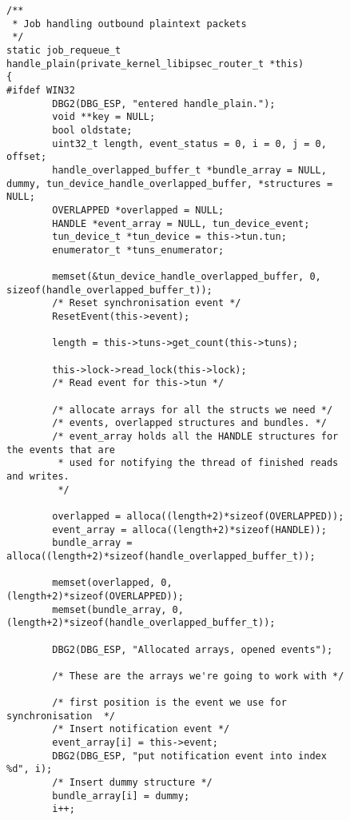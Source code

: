 \begin{figure}
\label{lst:handle_plain_windows}
\begin{lstlisting}[caption=Code für handle\_plain auf Windows]
/**
 * Job handling outbound plaintext packets
 */
static job_requeue_t handle_plain(private_kernel_libipsec_router_t *this)
{
#ifdef WIN32
        DBG2(DBG_ESP, "entered handle_plain.");
        void **key = NULL;
        bool oldstate;
        uint32_t length, event_status = 0, i = 0, j = 0, offset;
        handle_overlapped_buffer_t *bundle_array = NULL, dummy, tun_device_handle_overlapped_buffer, *structures = NULL;
        OVERLAPPED *overlapped = NULL;
        HANDLE *event_array = NULL, tun_device_event;
        tun_device_t *tun_device = this->tun.tun;
        enumerator_t *tuns_enumerator;

        memset(&tun_device_handle_overlapped_buffer, 0, sizeof(handle_overlapped_buffer_t));
        /* Reset synchronisation event */
        ResetEvent(this->event);

        length = this->tuns->get_count(this->tuns);

        this->lock->read_lock(this->lock);
        /* Read event for this->tun */

        /* allocate arrays for all the structs we need */
        /* events, overlapped structures and bundles. */
        /* event_array holds all the HANDLE structures for the events that are
         * used for notifying the thread of finished reads and writes.
         */

        overlapped = alloca((length+2)*sizeof(OVERLAPPED));
        event_array = alloca((length+2)*sizeof(HANDLE));
        bundle_array = alloca((length+2)*sizeof(handle_overlapped_buffer_t));

        memset(overlapped, 0, (length+2)*sizeof(OVERLAPPED));
        memset(bundle_array, 0, (length+2)*sizeof(handle_overlapped_buffer_t));

        DBG2(DBG_ESP, "Allocated arrays, opened events");

        /* These are the arrays we're going to work with */

        /* first position is the event we use for synchronisation  */
        /* Insert notification event */
        event_array[i] = this->event;
        DBG2(DBG_ESP, "put notification event into index %d", i);
        /* Insert dummy structure */
        bundle_array[i] = dummy;
        i++;


\end{lstlisting}
\end{figure}
